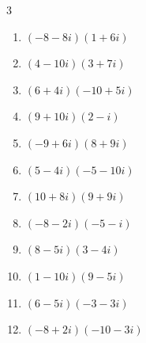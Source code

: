 


\setcounter{quesnum}{45}

\begin{multicols}{3}
\begin{enumerate}
  \itemsep=10pt
  \item $\displaystyle (-8-8i)(1+6i)$

        \phantom{$\displaystyle =40-56i$}

  \item $\displaystyle (4-10i)(3+7i)$

        \phantom{$\displaystyle =82-2i$}

  \item $\displaystyle (6+4i)(-10+5i)$

        \phantom{$\displaystyle =-80-10i$}

  \item $\displaystyle (9+10i)(2-i)$

        \phantom{$\displaystyle =28+11i$}

  \item $\displaystyle (-9+6i)(8+9i)$

        \phantom{$\displaystyle =-126-33i$}

  \item $\displaystyle (5-4i)(-5-10i)$

        \phantom{$\displaystyle =-65-30i$}

  \item $\displaystyle (10+8i)(9+9i)$

        \phantom{$\displaystyle =18+162i$}

  \item $\displaystyle (-8-2i)(-5-i)$

        \phantom{$\displaystyle =38+18i$}

  \item $\displaystyle (8-5i)(3-4i)$

        \phantom{$\displaystyle =4-47i$}

  \item $\displaystyle (1-10i)(9-5i)$

        \phantom{$\displaystyle =-41-95i$}

  \item $\displaystyle (6-5i)(-3-3i)$

        \phantom{$\displaystyle =-33-3i$}

  \item $\displaystyle (-8+2i)(-10-3i)$


\end{enumerate}
\end{multicols}
